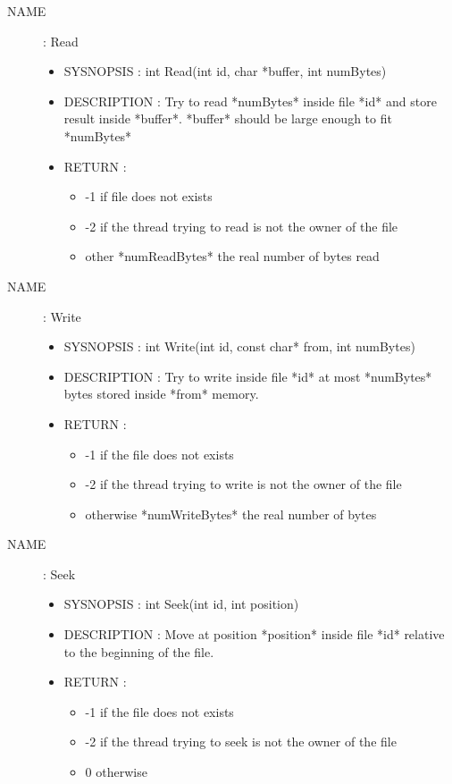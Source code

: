 \documentclass[a4paper,10pt]{article}
\begin{document}
\begin{description}
    \item [NAME] : Read
        \begin{itemize}
            \item SYSNOPSIS : int Read(int id, char *buffer, int numBytes)
            \item DESCRIPTION :
                Try to read *numBytes* inside file *id* and store result inside *buffer*.
                *buffer* should be large enough to fit *numBytes*
            \item RETURN :
                \begin{itemize}
                    \item -1 if file does not exists
                    \item -2 if the thread trying to read is not the owner of the file
                    \item other *numReadBytes* the real number of bytes read
                \end{itemize}
        \end{itemize}

    \item [NAME] : Write
        \begin{itemize}
            \item SYSNOPSIS : int Write(int id, const char* from, int numBytes)
            \item DESCRIPTION :
                Try to write inside file *id* at most *numBytes* bytes stored inside *from*
                memory.
            \item RETURN :
                \begin{itemize}
                    \item -1 if the file does not exists
                    \item -2 if the thread trying to write is not the owner of the file
                    \item otherwise *numWriteBytes* the real number of bytes
                \end{itemize}
        \end{itemize}

    \item [NAME] : Seek
        \begin{itemize}
            \item SYSNOPSIS : int Seek(int id, int position)
            \item DESCRIPTION :
                Move at position *position* inside file *id* relative to the beginning of
                the file.
            \item RETURN :
                \begin{itemize}
                    \item -1 if the file does not exists
                    \item -2 if the thread trying to seek is not the owner of the file
                    \item 0 otherwise
                \end{itemize}
        \end{itemize}


\end{description}
\end{document}
